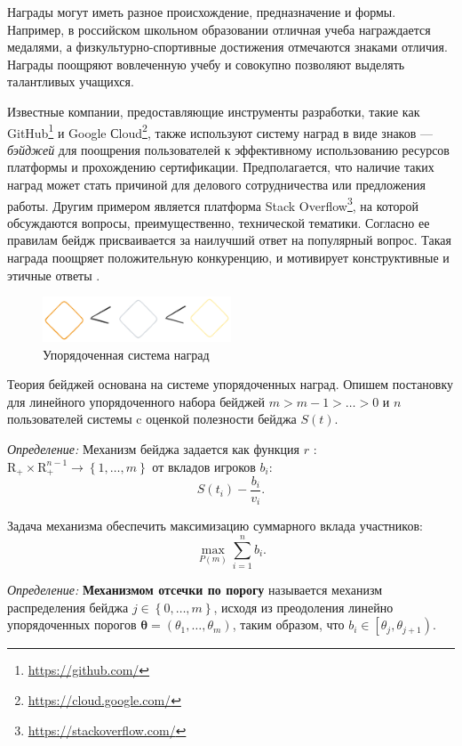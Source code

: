 Награды могут иметь разное происхождение, предназначение и формы. 
Например, в российском школьном образовании отличная учеба награждается медалями, 
а физкультурно-спортивные достижения отмечаются знаками отличия. 
Награды поощряют вовлеченную учебу и совокупно позволяют выделять талантливых учащихся. 

Известные компании, предоставляющие инструменты разработки, такие как GitHub\footnote{\url{https://github.com/}}
и Google Сloud\footnote{\url{https://cloud.google.com/}}, также используют систему наград в виде знаков --- \textit{бэйджей}
для поощрения пользователей к эффективному использованию ресурсов платформы и прохождению сертификации. 
Предполагается, что наличие таких наград может стать причиной для делового сотрудничества или предложения работы. 
Другим примером является платформа Stack Overflow\footnote{\url{https://stackoverflow.com/}}, на которой обсуждаются вопросы, преимущественно, технической тематики.
Согласно ее правилам бейдж присваивается за наилучший ответ на популярный вопрос. Такая награда поощряет положительную конкуренцию, и мотивирует 
конструктивные и этичные ответы \cite{yanovsky2021one}.
\begin{figure}[h]
    \centering
    \includegraphics[width=0.5\textwidth]{assets/pedagogic/social/badge.excalidraw.png}
    \caption{Упорядоченная система наград}
    \label{badge}
\end{figure}

Теория бейджей основана на системе упорядоченных наград. Опишем постановку для линейного
упорядоченного набора бейджей $m > m-1 > \dots > 0$ и $n$ пользователей системы c оценкой полезности бейджа $S(t)$. 

\textit{Определение:} Механизм бейджа задается как функция $r$ : $\mathrm{R}_{+} \times \mathrm{R}_{+}^{n-1} \rightarrow \left\{1, \dots,m \right\}$ 
от вкладов игроков $b_i$:
\begin{equation}
    S(t_i) - \frac{b_i}{v_i}.
\end{equation}

Задача механизма обеспечить максимизацию суммарного вклада участников:
\begin{equation}
    \max_{P(m)} \sum_{i=1}^n b_i.
\end{equation}

\textit{Определение:} \textbf{Механизмом отсечки по порогу} называется механизм распределения
бейджа $j \in \left\{0,\dots,m\right\}$, исходя из преодоления линейно упорядоченных порогов
$\mathbf{\theta} =(\theta_1,\dots,\theta_m)$, таким образом, что $b_i \in \left[\theta_j,\theta_{j+1}\right)$.

